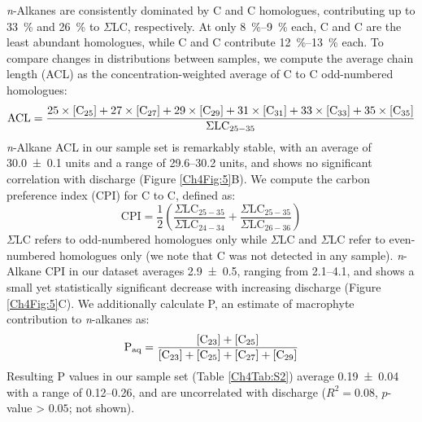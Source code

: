 \textit{n}-Alkanes are consistently dominated by C and C homologues, contributing up to \SI{33}{\%} and \SI{26}{\%} to $\Sigma$LC, respectively. At only \SIrange{8}{9}{\%} each, C and C are the least abundant homologues, while C and C contribute \SIrange{12}{13}{\%} each. To compare changes in distributions between samples, we compute the average chain length (ACL) as the concentration-weighted average of C to C odd-numbered homologues:
%
\begin{equation}\label{Ch4Eq:1}
\text{ACL} = \frac{25\times[\ce{C}_{25}] + 27\times[\ce{C}_{27}] + 29\times[\ce{C}_{29}] + 31\times[\ce{C}_{31}] + 33\times[\ce{C}_{33}] + 35\times[\ce{C}_{35}]}{\Sigma \text{LC}_{25-35}}
\end{equation}
%
\textit{n}-Alkane ACL in our sample set is remarkably stable, with an average of \num{30.0 \pm 0.1} units and a range of \numrange{29.6}{30.2} units, and shows no significant correlation with discharge (Figure \ref{Ch4Fig:5}B). We compute the carbon preference index (CPI) for C to C, defined as: 
%
\begin{equation}\label{Ch4Eq:2}
\text{CPI} = \frac{1}{2} \left( \frac{\Sigma \text{LC}_{25-35}}{\Sigma \text{LC}_{24-34}} + \frac{\Sigma \text{LC}_{25-35}}{\Sigma \text{LC}_{26-36}} \right)
\end{equation}
%
$\Sigma$LC refers to odd-numbered homologues only while $\Sigma$LC and $\Sigma$LC refer to even-numbered homologues only (we note that C was not detected in any sample). \textit{n}-Alkane CPI in our dataset averages \num{2.9 \pm 0.5}, ranging from \numrange{2.1}{4.1}, and shows a small yet statistically significant decrease with increasing discharge (Figure \ref{Ch4Fig:5}C). We additionally calculate P, an estimate of macrophyte contribution to \textit{n}-alkanes \citep{Ficken:2000wq} as:
%
\begin{equation}\label{Ch4Eq:3}
\text{P}_{\text{aq}} = \frac{[\ce{C}_{23}] + [\ce{C}_{25}]}{[\ce{C}_{23}] + [\ce{C}_{25}] + [\ce{C}_{27}] + [\ce{C}_{29}]}
\end{equation}
%
Resulting P values in our sample set (Table \ref{Ch4Tab:S2}) average \num{0.19 \pm 0.04} with a range of \numrange{0.12}{0.26}, and are uncorrelated with discharge ($R^2 = 0.08$, $p$-value > $0.05$; not shown).

